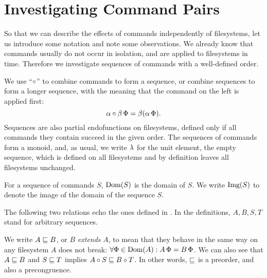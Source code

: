 

\section{Investigating Command Pairs}


So that we can describe the effects of commands independently of filesystems,
let us introduce some notation
and note some observations.
We already know that
commands usually do not occur in isolation,
and are applied to filesystems in time.
Therefore we investigate sequences of commands with a well-defined order.
\begin{mydef}
We use ``$\mathbin{\circ}$'' to combine commands to form a sequence, or combine sequences to form a longer sequence,
with the meaning that the command on the left is applied first:
\[ \alpha\mathbin{\circ}\beta\,\Phi = \beta(\alpha\,\Phi). \]
Sequences are also partial endofunctions on filesystems,
defined only if all commands they contain succeed in the given order.
The sequences of commands form a monoid, and, as usual,
we write $\lambda$ for the unit element, the empty sequence,
which is defined on all filesystems and by definition leaves all filesystems unchanged.
\end{mydef}

\begin{mydef}
For a sequence of commands $S$, $\textrm{Dom}({S})$ is the domain of $S$.
We write $\textrm{Img}({S})$ to denote the image of the domain of the sequence $S$.
\end{mydef}


The following two relations 
echo the ones defined in \cite{NREC}.
In the definitions, $A,B,S,T$ stand for arbitrary sequences.

\begin{mydef}[$\eqext$]
We write $A\sqsubseteq B$, or $B$ \emph{extends} $A$,
to mean that they behave in the same way
on any filesystem $A$ does not break:
$\forall \Phi\in\textrm{Dom}({A}): A\,\Phi=B\,\Phi$.
We can also see that $A\sqsubseteq B$ and $S\sqsubseteq T$ implies $A\mathbin{\circ} S\sqsubseteq B\mathbin{\circ} T$.
In other words, $\eqext$ is a preorder, and also a precongruence.
\end{mydef}

